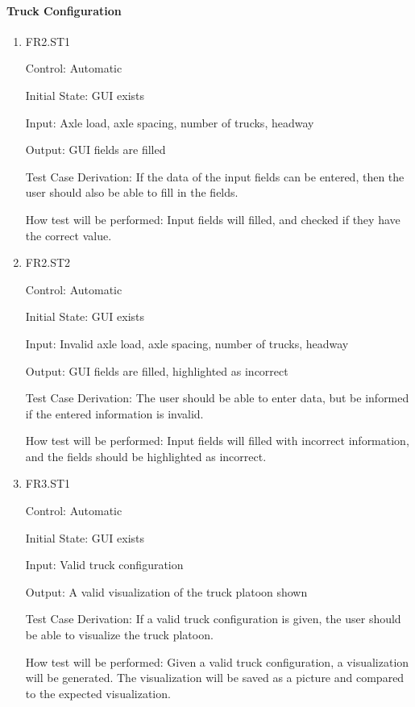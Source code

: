 \documentclass[12pt, titlepage]{article}
\begin{document}
\paragraph{Truck Configuration}

\begin{enumerate}

  \item{FR2.ST1\\}

  Control: Automatic

  Initial State: GUI exists

  Input: Axle load, axle spacing, number of trucks, headway

  Output: GUI fields are filled

  Test Case Derivation: If the data of the input fields can be entered, then the user
  should also be able to fill in the fields.

  How test will be performed: Input fields will filled, and checked if they have the
  correct value.

  \item{FR2.ST2\\}

  Control: Automatic

  Initial State: GUI exists

  Input: Invalid axle load, axle spacing, number of trucks, headway

  Output: GUI fields are filled, highlighted as incorrect

  Test Case Derivation: The user should be able to enter data, but be informed if the
  entered information is invalid.

  How test will be performed: Input fields will filled with incorrect information, 
  and the fields should be highlighted as incorrect.

  \item{FR3.ST1\\}

  Control: Automatic

  Initial State: GUI exists

  Input: Valid truck configuration

  Output: A valid visualization of the truck platoon shown

  Test Case Derivation: If a valid truck configuration is given, the user should be able to
  visualize the truck platoon.

  How test will be performed: Given a valid truck configuration, a visualization will be generated.
  The visualization will be saved as a picture and compared to the expected visualization.


\end{enumerate}
\end{document}
